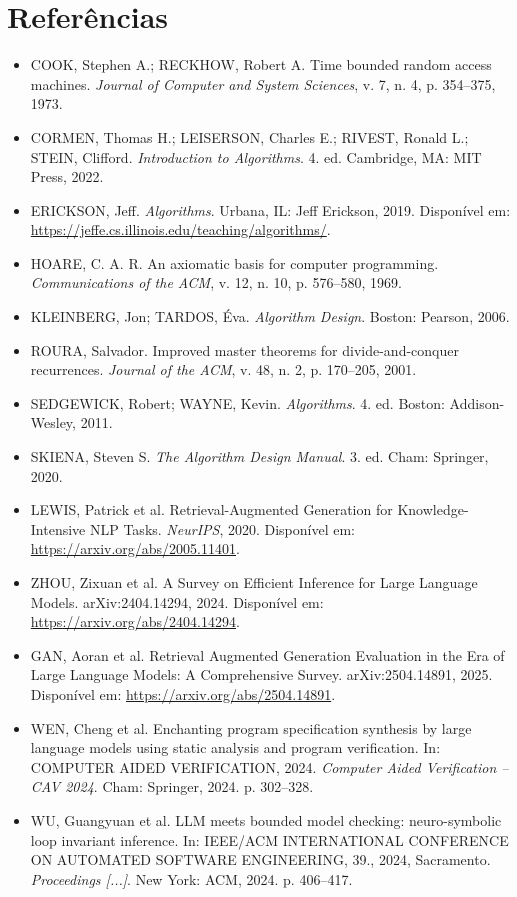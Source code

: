 \documentclass[12pt, a4paper]{article}
\begin{document}
\section{Referências}
\begin{itemize}
    \item COOK, Stephen A.; RECKHOW, Robert A. Time bounded random access machines. \textit{Journal of Computer and System Sciences}, v. 7, n. 4, p. 354–375, 1973.
    \item CORMEN, Thomas H.; LEISERSON, Charles E.; RIVEST, Ronald L.; STEIN, Clifford. \textit{Introduction to Algorithms}. 4. ed. Cambridge, MA: MIT Press, 2022.
    \item ERICKSON, Jeff. \textit{Algorithms}. Urbana, IL: Jeff Erickson, 2019. Disponível em: \url{https://jeffe.cs.illinois.edu/teaching/algorithms/}.
    \item HOARE, C. A. R. An axiomatic basis for computer programming. \textit{Communications of the ACM}, v. 12, n. 10, p. 576–580, 1969.
    \item KLEINBERG, Jon; TARDOS, Éva. \textit{Algorithm Design}. Boston: Pearson, 2006.
    \item ROURA, Salvador. Improved master theorems for divide-and-conquer recurrences. \textit{Journal of the ACM}, v. 48, n. 2, p. 170–205, 2001.
    \item SEDGEWICK, Robert; WAYNE, Kevin. \textit{Algorithms}. 4. ed. Boston: Addison-Wesley, 2011.
    \item SKIENA, Steven S. \textit{The Algorithm Design Manual}. 3. ed. Cham: Springer, 2020.
    \item LEWIS, Patrick et al. Retrieval-Augmented Generation for Knowledge-Intensive NLP Tasks. \textit{NeurIPS}, 2020. Disponível em: \url{https://arxiv.org/abs/2005.11401}.
    \item ZHOU, Zixuan et al. A Survey on Efficient Inference for Large Language Models. arXiv:2404.14294, 2024. Disponível em: \url{https://arxiv.org/abs/2404.14294}.
    \item GAN, Aoran et al. Retrieval Augmented Generation Evaluation in the Era of Large Language Models: A Comprehensive Survey. arXiv:2504.14891, 2025. Disponível em: \url{https://arxiv.org/abs/2504.14891}.
    \item WEN, Cheng et al. Enchanting program specification synthesis by large language models using static analysis and program verification. In: COMPUTER AIDED VERIFICATION, 2024. \textit{Computer Aided Verification – CAV 2024}. Cham: Springer, 2024. p. 302–328.
    \item WU, Guangyuan et al. LLM meets bounded model checking: neuro-symbolic loop invariant inference. In: IEEE/ACM INTERNATIONAL CONFERENCE ON AUTOMATED SOFTWARE ENGINEERING, 39., 2024, Sacramento. \textit{Proceedings [...]}. New York: ACM, 2024. p. 406–417.
\end{itemize}
\end{document}

